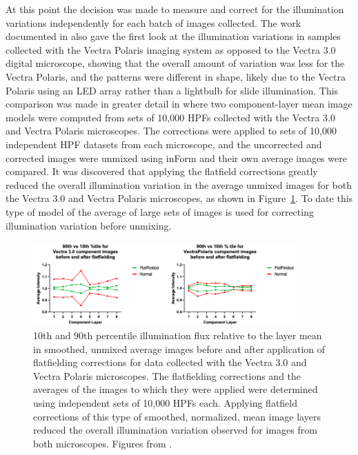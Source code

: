 \documentclass[letterpaper,11pt]{article}
\newcommand{\reffig}[1]{Figure~\ref{#1}}
\begin{document}
At this point the decision was made to measure and correct for the illumination variations independently for each batch of images collected. The work documented in \cite{Ben_flatfielding_1} also gave the first look at the illumination variations in samples collected with the Vectra Polaris imaging system as opposed to the Vectra 3.0 digital microscope, showing that the overall amount of variation was less for the Vectra Polaris, and the patterns were different in shape, likely due to the Vectra Polaris using an LED array rather than a lightbulb for slide illumination. This comparison was made in greater detail in \cite{Ben_flatfielding_2} where two component-layer mean image models were computed from sets of 10,000 HPFs collected with the Vectra 3.0 and Vectra Polaris microscopes. The corrections were applied to sets of 10,000 independent HPF datasets from each microscope, and the uncorrected and corrected images were unmixed using inForm and their own average images were compared. It was discovered that applying the flatfield corrections greatly reduced the overall illumination variation in the average unmixed images for both the Vectra 3.0 and Vectra Polaris microscopes, as shown in \reffig{fig:fourth_flatfielding}. To date this type of model of the average of large sets of images is used for correcting illumination variation before unmixing.

\begin{figure}[!ht]
\centering
\includegraphics[width=0.9\textwidth]{images/introduction/fourth_flatfield_impact}
\caption{\footnotesize 10th and 90th percentile illumination flux relative to the layer mean in smoothed, unmixed average images before and after application of flatfielding corrections for data collected with the Vectra 3.0 and Vectra Polaris microscopes. The flatfielding corrections and the averages of the images to which they were applied were determined using independent sets of 10,000 HPFs each. Applying flatfield corrections of this type of smoothed, normalized, mean image layers reduced the overall illumination variation observed for images from both microscopes. Figures from \cite{Ben_flatfielding_1}.}
\label{fig:fourth_flatfielding}
\end{figure}
\end{document}
